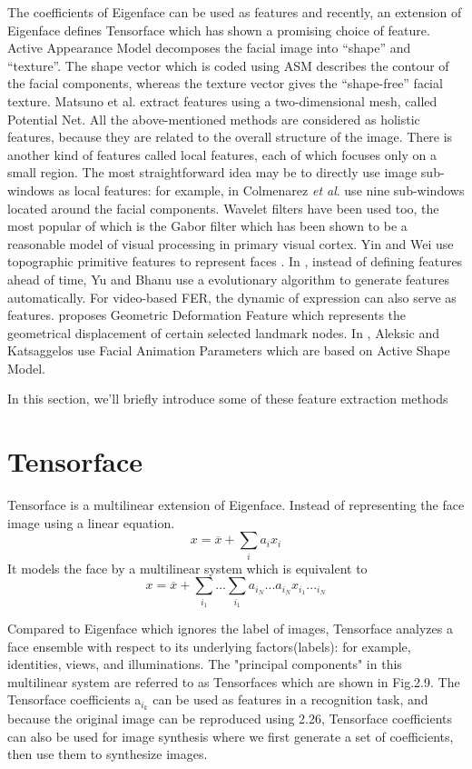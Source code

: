 \documentclass[12pt]{report}
\begin{document}
The coefficients of Eigenface can be used as features and recently, an extension of Eigenface defines Tensorface which has shown a promising choice of feature. Active Appearance Model  decomposes the facial image into “shape” and “texture”. The shape vector which is coded using ASM describes the contour of the facial components, whereas
the texture vector gives the “shape-free” facial texture. Matsuno et al.  extract features using a two-dimensional mesh, called Potential Net. All the above-mentioned methods are considered as holistic features, because they are related to the overall structure of the image. There is another kind of features called local features, each of which focuses only on a small region. The most straightforward idea may be to directly use image sub-windows as local features: for example, in \cite{15} Colmenarez \textit{ et al}. use nine sub-windows located around the facial components. Wavelet filters have been used too, the most popular of which is the Gabor filter which has been shown \cite{22} \cite{37} to be a reasonable model of visual processing in primary visual cortex. Yin and Wei use topographic primitive features to represent faces \cite{103}. In \cite{104}, instead of defining features ahead of time, Yu and Bhanu use a evolutionary algorithm to generate features automatically. For video-based FER, the dynamic of expression can also serve as features. \cite{44} proposes Geometric Deformation Feature which represents the geometrical displacement of certain selected landmark nodes. In \cite{1}, Aleksic and Katsaggelos use Facial Animation Parameters which are based on Active Shape Model.
\par In this section, we'll briefly introduce some of these feature extraction methods
\par
\section {Tensorface}
Tensorface \cite{90} is a multilinear extension of Eigenface. Instead of representing the face image using a linear equation.
\begin{equation}
x=\overline{x}+\sum_{i}a_i x_i
\end{equation}
It models the face by a multilinear system which is equivalent to
\begin{equation}
x=\overline{x}+\sum_{i_1}...\sum_{i_1}a_{i_N}...a_{i_N} x_{i_1}..._{i_N}
\end{equation}
\par 
Compared to Eigenface which ignores the label of images, Tensorface analyzes a face ensemble with respect to its underlying factors(labels): for example, identities, views, and illuminations. The "principal components" in this multilinear system are referred to as Tensorfaces which are shown in Fig.2.9. The Tensorface coefficients a$_{i_k}$ can be used as features in a recognition task, and because the original image can be reproduced using 2.26, Tensorface coefficients can also be used for image synthesis where we first generate a set of coefficients, then use them to synthesize images.
\end{document}
